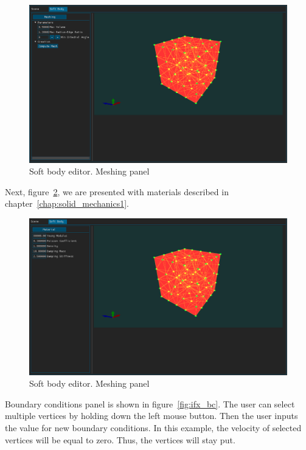 \documentclass[en]{minipw} %
\begin{document}
\begin{figure}[h!]
\centering
\includegraphics[scale=0.3]{pictures/ifx/ifx_meshing.png}
\caption[Soft body editor. Meshing panel]{Soft body editor. Meshing panel}
\label{fig:ifx_meshing}
\end{figure}

Next, figure~\ref{fig:ifx_material}, we are presented with materials described in chapter~\ref{chap:solid_mechanics1}.

\begin{figure}[h!]
\centering
\includegraphics[scale=0.3]{pictures/ifx/ifx_material.png}
\caption[Soft body editor. Material panel]{Soft body editor. Meshing panel}
\label{fig:ifx_material}
\end{figure}

Boundary conditions panel is shown in figure~\ref{fig:ifx_bc}. The user can select multiple vertices by holding down the left mouse button. Then the user inputs the value for new boundary conditions. In this example, the velocity of selected vertices will be equal to zero. Thus, the vertices will stay put.
\end{document}
